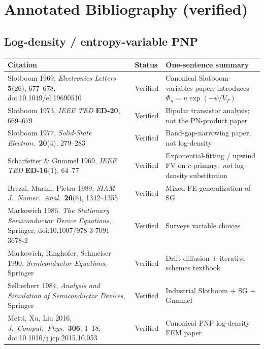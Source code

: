 \documentclass[11pt]{article}
\newcommand{\VT}{V_{T}}
\begin{document}
\section{Annotated Bibliography (verified)}

\subsection{Log-density / entropy-variable PNP}

\begingroup
\small
\setlength{\tabcolsep}{4pt}
\renewcommand{\arraystretch}{1.2}
\begin{longtable}{@{}p{} p{} p{}@{}}
\toprule
\textbf{Citation} & \textbf{Status} & \textbf{One-sentence summary} \\
\midrule
\endhead
Slotboom 1969, \emph{Electronics Letters} \textbf{5}(26), 677--678,
doi:10.1049/el:19690510 &
Verified &
Canonical Slotboom-variables paper; introduces $\Phi_n=n\exp(-\psi/\VT)$ \\
Slotboom 1973, \emph{IEEE TED} \textbf{ED-20}, 669--679 &
Verified &
Bipolar transistor analysis; not the PN-product paper \\
Slotboom 1977, \emph{Solid-State Electron.}\ \textbf{20}(4), 279--283 &
Verified &
Band-gap-narrowing paper, not log-density \\
Scharfetter \& Gummel 1969, \emph{IEEE TED} \textbf{ED-16}(1), 64--77 &
Verified &
Exponential-fitting / upwind FV on $c$-primary; \emph{not} log-density
substitution \\
Brezzi, Marini, Pietra 1989, \emph{SIAM J.~Numer.~Anal.}\ \textbf{26}(6),
1342--1355 &
Verified &
Mixed-FE generalization of SG \\
Markowich 1986, \emph{The Stationary Semiconductor Device Equations}, Springer,
doi:10.1007/978-3-7091-3678-2 &
Verified &
Surveys variable choices \\
Markowich, Ringhofer, Schmeiser 1990, \emph{Semiconductor Equations}, Springer
&
Verified &
Drift-diffusion $+$ iterative schemes textbook \\
Selberherr 1984, \emph{Analysis and Simulation of Semiconductor Devices},
Springer &
Verified &
Industrial Slotboom $+$ SG $+$ Gummel \\
Metti, Xu, Liu 2016, \emph{J.~Comput.~Phys.}\ \textbf{306}, 1--18,
doi:10.1016/j.jcp.2015.10.053 &
Verified &
Canonical PNP log-density FEM paper \\

\end{longtable}
\end{document}
